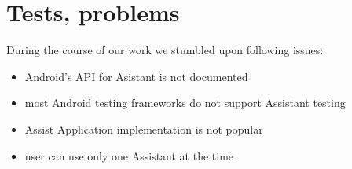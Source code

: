 \documentclass[11pt,a4paper]{article}
\begin{document}
\section{Tests, problems}

During the course of our work we stumbled upon following issues:
\begin{itemize}
    \item Android's API for Asistant is not documented
    \item most Android testing frameworks do not support Assistant testing
    \item Assist Application implementation is not popular
    \item user can use only one Assistant at the time
\end{itemize}
\end{document}

